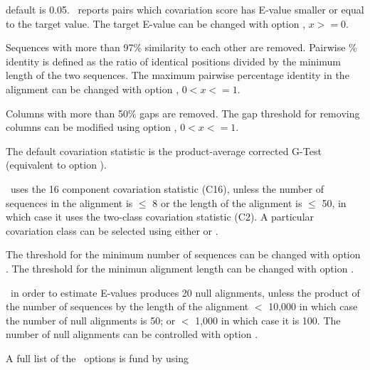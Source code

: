 \begin{sreitems}{}
\item[\emprog{Target E-value:}]default is 0.05. \rscape\, reports
  pairs which covariation score has E-value smaller or equal to the
  target value.  The target E-value can be changed with option
  , $x >= 0$.

\item[\emprog{Pairwise percent identity:}]Sequences with more than
  97\% similarity to each other are removed.  Pairwise \% identity is
  defined as the ratio of identical positions divided by the minimum
  length of the two sequences. The maximum pairwise percentage
  identity in the alignment can be changed with option , $0<x<=1$.

\item[\emprog{Gaps in columns}]Columns with more than 50\% gaps are
  removed. The gap threshold for removing columns can be modified
   using option  , $0<x<=1$.

 \item[\emprog{Covariation statistic}]The default covariation statistic
   is the product-average corrected G-Test (equivalent to option
   ).

 \item[\emprog{Covariation Class}]\rscape\ uses the 16 component
   covariation statistic (C16), unless the number of sequences in the
   alignment is $\leq$ 8 or the length of the alignment is $\leq$ 50,
   in which case it uses the two-class covariation statistic (C2). A
   particular covariation class can be selected using either
    or .

   The threshold for the minimum number of sequences can be changed
   with option .  The threshold for the minimun
   alignment length can be changed with option .

 \item[\emprog{Null alignments:}]\rscape\ in order to estimate E-values
   produces 20 null alignments, unless the product of the number of
   sequences by the length of the alignment $<$ 10,000 in which case
   the number of null alignments is 50; or $<$ 1,000 in which case it
   is 100. The number of null alignments can be controlled with option
   .
 \end{sreitems}

 A full list of the \rscape\ options is fund by using

